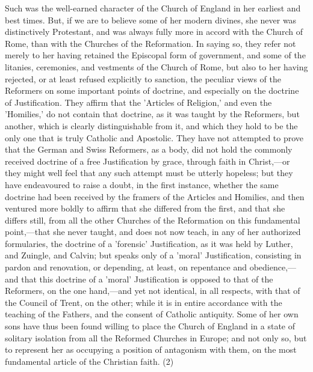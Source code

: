 \documentclass[
]{book}
\begin{document}
Such was the well-earned character of the Church of England in her earliest and best times. But, if we are to believe some of her modern divines, she never was distinctively Protestant, and was always fully more in accord with the Church of Rome, than with the Churches of the Reformation. In saying so, they refer not merely to her having retained the Episcopal form of government, and some of the litanies, ceremonies, and vestments of the Church of Rome, but also to her having rejected, or at least refused explicitly to sanction, the peculiar views of the Reformers on some important points of doctrine, and especially on the doctrine of Justification. They affirm that the 'Articles of Religion,' and even the 'Homilies,' do not contain that doctrine, as it was taught by the Reformers, but another, which is clearly distinguishable from it, and which they hold to be the only one that is truly Catholic and Apostolic. They have not attempted to prove that the German and Swiss Reformers, as a body, did not hold the commonly received doctrine of a free Justification by grace, through faith in Christ,---or they might well feel that any such attempt must be utterly hopeless; but they have endeavoured to raise a doubt, in the first instance, whether the same doctrine had been received by the framers of the Articles and Homilies, and then ventured more boldly to affirm that she differed from the first, and that she differs still, from all the other Churches of the Reformation on this fundamental point,---that she never taught, and does not now teach, in any of her authorized formularies, the doctrine of a 'forensic' Justification, as it was held by Luther, and Zuingle, and Calvin; but speaks only of a 'moral' Justification, consisting in pardon and renovation, or depending, at least, on repentance and obedience,---and that this doctrine of a 'moral' Justification is opposed to that of the Reformers, on the one hand,---and yet not identical, in all respects, with that of the Council of Trent, on the other; while it is in entire accordance with the teaching of the Fathers, and the consent of Catholic antiquity. Some of her own sons have thus been found willing to place the Church of England in a state of solitary isolation from all the Reformed Churches in Europe; and not only so, but to represent her as occupying a position of antagonism with them, on the most fundamental article of the Christian faith. (2)
\end{document}
